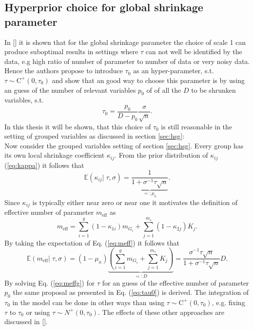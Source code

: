 \documentclass[12pt,letterpaper]{article}
\numberwithin{equation}{subsection}
\begin{document}
\subsection{Hyperprior choice for global shrinkage parameter}
\label{sec:opt}
In [\cite{horseshoe}] it is shown that for the global shrinkage parameter the choice of scale 1 can produce suboptimal results  in settings where $\tau$ can not well be identified by the data, e.g high ratio of number of parameter to number of data or very noisy data. Hence the authors propose to introduce $\tau_0$ as an hyper-parameter, s.t. $\tau \sim \text{C}^+(0,\tau_0)$ and show that an good way to choose this parameter is by using an guess of the number of relevant variables $p_0$ of of all the $D$ to be shrunken variables, s.t.
\begin{equation}
\tau_0 = \frac{p_0}{D-p_0}\frac{\sigma}{\sqrt{n}}.
\label{eq:tau0}
\end{equation}
In this thesis it will be shown, that this choice of $\tau_0$ is still reasonable in the setting of grouped variables as discussed in section \ref{sec:hsg}: \\
Now consider the grouped variables setting of section \ref{sec:hsg}. 
Every group has its own local shrinkage coefficient $\kappa_{ij}$.
From the prior distribution of $\kappa_{ij}$ (\ref{eq:kappa}) it follows that
\begin{equation}
\mathbb{E}(\kappa_{ij}|\; \tau, \sigma) = \underbrace{\frac{1}{1+\sigma^{-1}\tau\sqrt{n}}}_{=:\mu_\kappa}.
\end{equation}
Since $\kappa_{ij}$ is typically either near zero or near one it motivates the definition of effective number of parameter $m_{\text{eff}}$ as 
\begin{equation}
m_{\text{eff}} = \sum^g_{i=1}(1-\kappa_{1i})m_{G_i} + \sum^{m_s}_{j=1}(1-\kappa_{2j})K_j.
\label{eq:meff}
\end{equation}
By taking the expectation of Eq. (\ref{eq:meff}) it follows that
\begin{equation}
\mathbb{E}(m_{\text{eff}}|\; \tau, \sigma) = (1-\mu_\kappa)\underbrace{( \sum^g_{i=1}m_{G_i} + \sum^{m_s}_{j=1}K_j)}_{=: D} = \frac{\sigma^{-1}\tau\sqrt{n}}{1+\sigma^{-1}\tau\sqrt{n}}D.
\label{eq:meffg}
\end{equation}
By solving Eq. (\ref{eq:meffg}) for $\tau$ for an guess of the effective number of parameter $p_0$ the same proposal as presented in Eq. (\ref{eq:tau0}) is derived. The integration of $\tau_0$ in the model can be done in other ways than using $\tau \sim \text{C}^+(0,\tau_0)$, e.g. fixing $\tau$ to $\tau_0$ or using $\tau \sim N^+(0,\tau_0)$. The effects of these other approaches are discussed in [\cite{horseshoe}].
\end{document}
